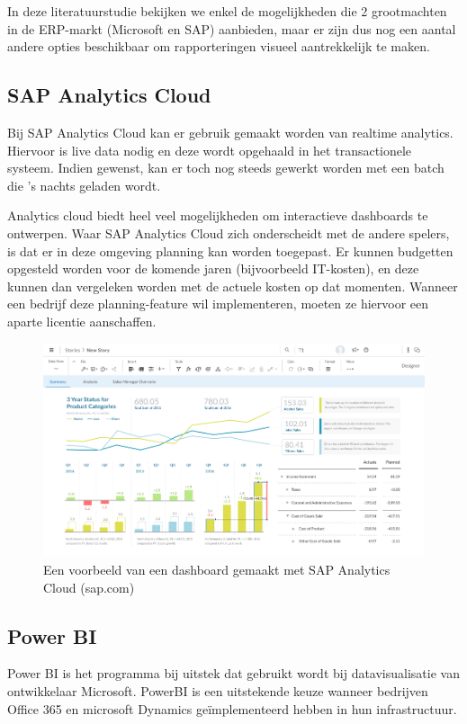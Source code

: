 In deze literatuurstudie bekijken we enkel de mogelijkheden die 2 grootmachten in de ERP-markt (Microsoft en SAP) aanbieden, maar er zijn dus nog een aantal andere opties beschikbaar om rapporteringen visueel aantrekkelijk te maken. 

\subsection{SAP Analytics Cloud}
Bij SAP Analytics Cloud kan er gebruik gemaakt worden van realtime analytics. Hiervoor is live data nodig en deze wordt opgehaald in het transactionele systeem. Indien gewenst, kan er toch nog steeds gewerkt worden met een batch die 's nachts geladen wordt. 

Analytics cloud biedt heel veel mogelijkheden om interactieve dashboards te ontwerpen. Waar SAP Analytics Cloud zich onderscheidt met de andere spelers, is dat er in deze omgeving planning kan worden toegepast. Er kunnen budgetten opgesteld worden voor de komende jaren (bijvoorbeeld IT-kosten), en deze kunnen dan vergeleken worden met de actuele kosten op dat momenten. Wanneer een bedrijf deze planning-feature wil implementeren, moeten ze hiervoor een aparte licentie aanschaffen.

\begin{figure}[h]
	\centering
	\includegraphics[scale=0.45]{../images/sac.png}
	\caption{Een voorbeeld van een dashboard gemaakt met SAP Analytics Cloud (sap.com)}
	\label{fig:sac}
\end{figure}

\subsection{Power BI}
Power BI is het programma bij uitstek dat gebruikt wordt bij datavisualisatie van ontwikkelaar Microsoft. PowerBI is een uitstekende keuze wanneer bedrijven Office 365 en microsoft Dynamics geïmplementeerd hebben in hun infrastructuur.

